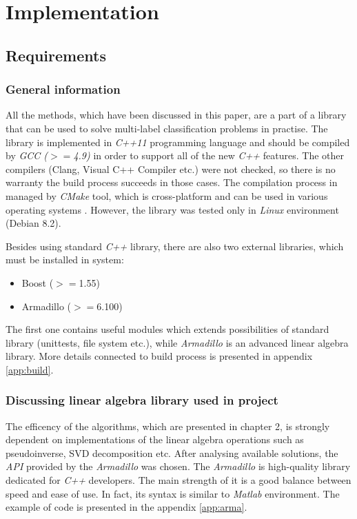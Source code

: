 \chapter{Implementation}

\section{Requirements}

\subsection{General information}
All the methods, which have been discussed in this paper, are a part of a library that can be used to solve multi-label classification problems in practise. The library is implemented in \textit{C++11} programming language and should be compiled by \textit{GCC ($>=$4.9)} in order to support all of the new \textit{C++} features. The other compilers (Clang, Visual C++ Compiler etc.) were not checked, so there is no warranty the build process succeeds in those cases.  The compilation process in managed by \textit{CMake} tool, which is cross-platform and can be used in various operating systems \cite{CMake}. However, the library was tested only in \textit{Linux} environment (Debian 8.2). 

Besides using standard \textit{C++} library, there are also two external libraries, which must be installed in system: 

\begin{itemize}
    \item Boost ($>=$1.55)
    \item Armadillo ($>=$6.100)
\end{itemize}
The first one contains useful modules which extends possibilities of standard library (unittests, file system etc.), while \textit{Armadillo} is an advanced linear algebra library. More details connected to build process is presented in appendix \ref{app:build}. 


\subsection{Discussing linear algebra library used in project}

The efficency of the algorithms, which are presented in chapter 2, is strongly dependent on  implementations of the linear algebra operations such as pseudoinverse, SVD decomposition etc. After analysing available solutions, the \textit{API} provided by the \textit{Armadillo} was chosen. The \textit{Armadillo} is high-quality library dedicated for \textit{C++} developers. The main strength of it is a good balance between speed and ease of use. In fact, its syntax is similar to \textit{Matlab} environment. The example of code is presented in the appendix \ref{app:arma}.

